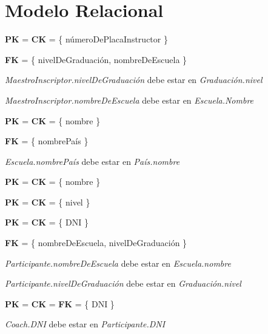 \section{Modelo Relacional}


\textbf{PK} = \textbf{CK} = \{ n\'umeroDePlacaInstructor \}

\textbf{FK} = \{ nivelDeGraduación, nombreDeEscuela \}

\textit{MaestroInscriptor.nivelDeGraduación} debe estar en \textit{Graduación.nivel}

\textit{MaestroInscriptor.nombreDeEscuela} debe estar en \textit{Escuela.Nombre}\\


\textbf{PK} = \textbf{CK} = \{ nombre \}

\textbf{FK} = \{ nombrePa\'is \}

\textit{Escuela.nombrePa\'is} debe estar en \textit{Pa\'is.nombre}\\


\textbf{PK} = \textbf{CK} = \{ nombre \}\\


\textbf{PK} = \textbf{CK} = \{ nivel \}\\


\textbf{PK} = \textbf{CK} = \{ DNI \}

\textbf{FK} = \{ nombreDeEscuela, nivelDeGraduación \}

\textit{Participante.nombreDeEscuela} debe estar en \textit{Escuela.nombre}

\textit{Participante.nivelDeGraduación} debe estar en \textit{Graduación.nivel}\\


\textbf{PK} = \textbf{CK} = \textbf{FK} = \{ DNI \}

\textit{Coach.DNI} debe estar en \textit{Participante.DNI}\\

